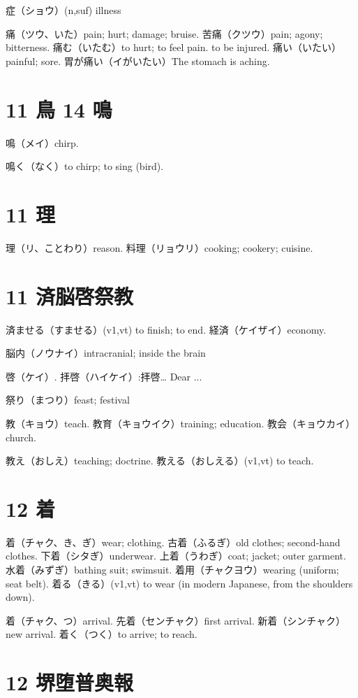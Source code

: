 症（ショウ）(n,suf) illness

痛（ツウ、いた）pain; hurt; damage; bruise.
苦痛（クツウ）pain; agony; bitterness.
痛む（いたむ）to hurt; to feel pain. to be injured.
痛い（いたい）painful; sore.
胃が痛い（イがいたい）The stomach is aching.

\section{11 鳥 14 鳴}

鳴（メイ）chirp.

鳴く（なく）to chirp; to sing (bird).

\section{11 理}

理（リ、ことわり）reason.
料理（リョウリ）cooking; cookery; cuisine.

\section{11 済脳啓祭教}

済ませる（すませる）(v1,vt) to finish; to end.
経済（ケイザイ）economy.

脳内（ノウナイ）intracranial; inside the brain

啓（ケイ）.
拝啓（ハイケイ）:拝啓… Dear ...

祭り（まつり）feast; festival

教（キョウ）teach.
教育（キョウイク）training; education.
教会（キョウカイ）church.

教え（おしえ）teaching; doctrine.
教える（おしえる）(v1,vt) to teach.

\section{12 着}

着（チャク、き、ぎ）wear; clothing.
古着（ふるぎ）old clothes; second-hand clothes.
下着（シタぎ）underwear.
上着（うわぎ）coat; jacket; outer garment.
水着（みずぎ）bathing suit; swimsuit.
着用（チャクヨウ）wearing (uniform; seat belt).
着る（きる）(v1,vt) to wear (in modern Japanese, from the shoulders down).

着（チャク、つ）arrival.
先着（センチャク）first arrival.
新着（シンチャク）new arrival.
着く（つく）to arrive; to reach.

\section{12 堺堕普奥報}

